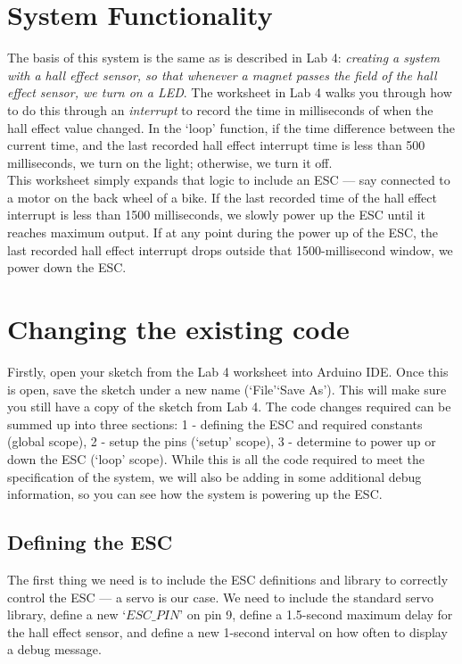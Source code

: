 \documentclass[11pt,a4paper]{article}
\begin{document}
\section{System Functionality}
\label{sec:functionality}
The basis of this system is the same as is described in Lab 4: \textit{creating a system with a hall effect sensor, so that whenever a magnet passes the field of the hall effect sensor, we turn on a LED}. The worksheet in Lab 4 walks you through how to do this through an \textit{interrupt} to record the time in milliseconds of when the hall effect value changed. In the `loop' function, if the time difference between the current time, and the last recorded hall effect interrupt time is less than 500 milliseconds, we turn on the light; otherwise, we turn it off.\\

\noindent
This worksheet simply expands that logic to include an ESC --- say connected to a motor on the back wheel of a bike. If the last recorded time of the hall effect interrupt is less than 1500 milliseconds, we slowly power up the ESC until it reaches maximum output. If at any point during the power up of the ESC, the last recorded hall effect interrupt drops outside that 1500-millisecond window, we power down the ESC.

\section{Changing the existing code}
Firstly, open your sketch from the Lab 4 worksheet into Arduino IDE. Once this is open, save the sketch under a new name (`File'\textrightarrow `Save As'). This will make sure you still have a copy of the sketch from Lab 4. The code changes required can be summed up into three sections: 1 - defining the ESC and required constants (global scope), 2 - setup the pins (`setup' scope), 3 - determine to power up or down the ESC (`loop' scope). While this is all the code required to meet the specification of the system, we will also be adding in some additional debug information, so you can see how the system is powering up the ESC.

\subsection{Defining the ESC}
The first thing we need is to include the ESC definitions and library to correctly control the ESC --- a servo is our case. We need to include the standard servo library, define a new `$ESC\_PIN$' on pin 9, define a 1.5-second maximum delay for the hall effect sensor, and define a new 1-second interval on how often to display a debug message.\\
\vspace{-1.75em}
\inputminted{arduino}{./src/1-define.txt}
\vspace{.75em}
\end{document}
